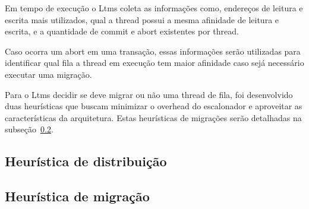 \documentclass[diss,capa]{texufpel}
\begin{document}
Em tempo de execução o Ltms coleta as informações como, endereços de leitura e escrita mais utilizados, qual a thread possui a mesma afinidade de leitura e escrita, e a quantidade de commit e abort existentes por thread.

Caso ocorra um abort em uma transação, essas informações serão utilizadas para identificar qual fila a thread em execução tem maior afinidade caso sejá necessário executar uma migração.

Para o Ltms decidir se deve migrar ou não uma thread de fila, foi desenvolvido duas heurísticas que buscam minimizar o overhead do escalonador e aproveitar as características da arquitetura. Estas heurísticas de migrações serão detalhadas na subseção~\ref{migration_heuristic}.

\subsection{Heurística de distribuição}
\label{distribuition_heuristic}


\subsection{Heurística de migração}
\label{migration_heuristic}




\end{document}
